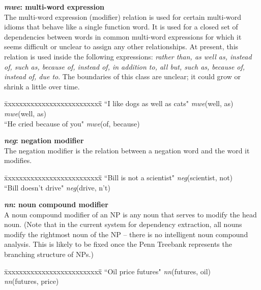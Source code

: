 \documentclass[11pt,letter]{article}
\begin{document}
\noindent\textbf{\emph{mwe}: multi-word expression}\\
The multi-word expression (modifier) relation is used for certain multi-word idioms
that behave like a single function word.  It is used for a closed set
of dependencies between words in common multi-word expressions for which
it seems difficult or unclear to assign any other relationships.  At
present, this relation is used inside the following expressions:
\emph{rather than, as well as, instead of, such as, because of, instead
  of, in addition to, all but, such as, because of, instead of, due to}.  The boundaries of this class are unclear; it could
grow or shrink a little over time.
\begin{tabbing}
\hspace{1cm} \= xxxxxxxxxxxxxxxxxxxxxxxxxx\= \hspace{.5cm}\=  \kill
\>  ``I like dogs as well as cats" \> \> \emph{mwe}(well, as)\\
\>                                 \> \> \emph{mwe}(well, as)\\
\> ``He cried because of you" \> \> \emph{mwe}(of, because)\\
\end{tabbing}

\noindent\textbf{\emph{neg}: negation modifier}\\
The negation modifier is the relation between a negation word and the word it modifies.
\begin{tabbing}
\hspace{1cm} \= xxxxxxxxxxxxxxxxxxxxxxxxxx\= \hspace{.5cm}\=  \kill
\>  ``Bill is not a scientist" \> \> \emph{neg}(scientist, not)\\
\> ``Bill doesn't drive" \> \> \emph{neg}(drive, n't)\\
\end{tabbing}

\noindent\textbf{\emph{nn}: noun compound modifier}\\
A noun compound modifier of an NP is any noun that serves to modify the head noun. (Note that in the current system for dependency extraction, all nouns modify the rightmost noun of the NP -- there is no intelligent noun compound analysis.  This is likely to be fixed once the Penn Treebank represents the branching structure of NPs.)
\begin{tabbing}
\hspace{1cm} \= xxxxxxxxxxxxxxxxxxxxxxxxxx\= \hspace{.5cm}\=  \kill
\>  ``Oil price futures" \> \> \emph{nn}(futures, oil)\\
\> \> \> \emph{nn}(futures, price)\\
\end{tabbing}
\end{document}
